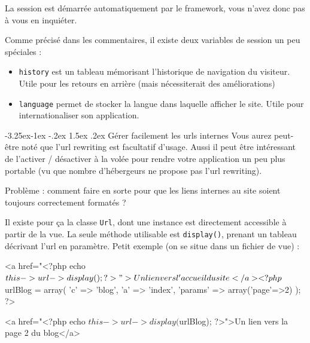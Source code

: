\documentclass[a4paper,11pt]{article}
\makeatletter
\renewcommand{\subsection}{\@startsection{subsection}{2}{\z@}%
             {-3.25ex\@plus -1ex \@minus -.2ex}%
             {1.5ex \@plus .2ex}%
             {\color{bleuFonce}\normalfont\large\bfseries}}
\makeatother
\begin{document}
La session est démarrée automatiquement par le framework, vous n'avez donc pas à vous en inquiéter.

Comme précisé dans les commentaires, il existe deux variables de session un peu spéciales :
\begin{itemize}
  \item \texttt{history} est un tableau mémorisant l'historique de navigation du visiteur. Utile pour les retours en arrière (mais nécessiterait des améliorations)
  \item \texttt{language} permet de stocker la langue dans laquelle afficher le site. Utile pour internationaliser son application.
\end{itemize}

\subsection{Gérer facilement les urls internes}
Vous aurez peut-être noté que l'url rewriting est facultatif d'usage. Aussi il peut être intéressant de l'activer / désactiver à la volée pour rendre votre application un peu plus portable (vu que nombre d'hébergeurs ne propose pas l'url rewriting).

Problème : comment faire en sorte pour que les liens internes au site soient toujours correctement formatés ?

Il existe pour ça la classe \texttt{Url}, dont une instance est directement accessible à partir de la vue. La seule méthode utilisable est \texttt{display()}, prenant un tableau décrivant l'url en paramètre. Petit exemple (on se situe dans un fichier de vue) :
\begin{HTML}
<a href="<?php echo $this->url->display(); ?>">Un lien vers l'accueil du site</a>

<?php
  $urlBlog = array(
    'c' => 'blog',
    'a' => 'index',
    'params' => array('page'=>2)
  );
?>

<a href="<?php echo $this->url->display($urlBlog); ?>">Un lien vers la page 2 du blog</a>
\end{HTML}
\end{document}
